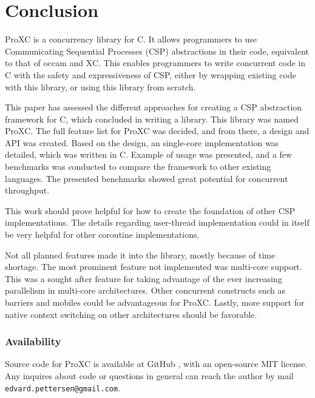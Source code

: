 
\chapter{Conclusion}
\label{ch:conclusion}

ProXC is a concurrency library for C. It allows programmers to use Communicating Sequential Processes (CSP) abstractions in their code, equivalent to that of occam and XC. This enables programmers to write concurrent code in C with the safety and expressiveness of CSP, either by wrapping existing code with this library, or using this library from scratch.

This paper has assessed the different approaches for creating a CSP abstraction framework for C, which concluded in writing a library. This library was named ProXC. The full feature list for ProXC was decided, and from there, a design and API was created. Based on the design, an single\hyp{}core implementation was detailed, which was written in C. Example of usage was presented, and a few benchmarks was conducted to compare the framework to other existing languages. The presented benchmarks showed great potential for concurrent throughput. 

This work should prove helpful for how to create the foundation of other CSP implementations. The details regarding user\hyp{}thread implementation could in itself be very helpful for other coroutine implementations. 

Not all planned features made it into the library, mostly because of time shortage. The most prominent feature not implemented was multi\hyp{}core support. This was a sought after feature for taking advantage of the ever increasing parallelism in multi\hyp{}core architectures. Other concurrent constructs such as barriers and mobiles could be advantageous for ProXC. Lastly, more support for native context switching on other architectures should be favorable.

\subsection*{Availability}
\label{subsec:availability}

Source code for ProXC is available at GitHub \citep{proxc_github}, with an open\hyp{}source MIT license. Any inquires about code or questions in general can reach the author by mail \texttt{edvard.pettersen@gmail.com}.

